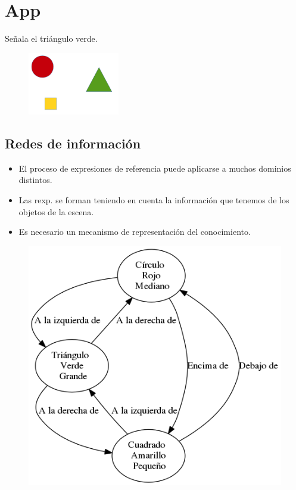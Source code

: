 \documentclass{beamer}
\begin{document}
	\section{App}
	
	\begin{frame}
		Señala el triángulo verde.
		
		\begin{figure}[H]
			\centering
			\includegraphics[width=40mm]{img/ejemplo1.png}			
		\end{figure}
	\end{frame}
	
	\subsection{Redes de información}
	
	\begin{frame}
		\begin{itemize}
			\item El proceso de expresiones de referencia puede aplicarse a muchos dominios distintos.
			\item Las rexp. se forman teniendo en cuenta la información que tenemos de los objetos de la escena.
			\item Es necesario un mecanismo de representación del conocimiento.
		\end{itemize}
	\end{frame}
	
	\begin{frame}
		\begin{figure}[H]
			\centering
			\includegraphics[scale=0.4]{img/RIejemplo1.png}
		\end{figure}
	\end{frame}
\end{document}
